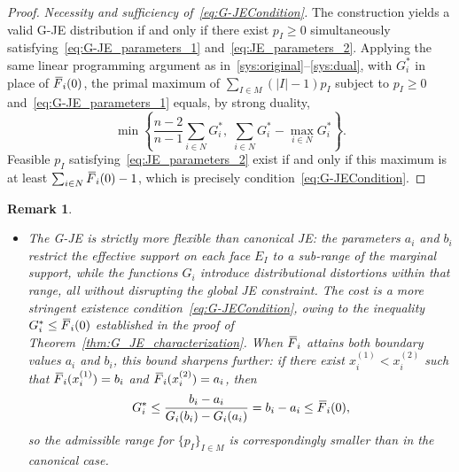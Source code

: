 \documentclass[letterpaper,12pt]{article}
\numberwithin{equation}{section}
\newtheorem{remark}[theorem]{Remark}
\newcommand{\N}{{N}}
\newcommand{\M}{{M}}
\newcommand{\I}{{I}}
\newcommand{\F}{\,\overline{\kern-0.175em F\kern-0em}}
\begin{document}
{\begin{proof}
\textit{Necessity and sufficiency of~\eqref{eq:G-JECondition}.}
The construction yields a valid G-JE distribution if and only if there exist
$p_\I\ge0$ simultaneously satisfying~\eqref{eq:G-JE_parameters_1}
and~\eqref{eq:JE_parameters_2}. Applying the same linear programming argument as
in~\eqref{sys:original}--\eqref{sys:dual}, with $G_i^*$ in place of $\F_i(0)$,
the primal maximum of $\sum_{\I\in\M}(|\I|-1)p_\I$ subject to
$p_\I\ge0$ and~\eqref{eq:G-JE_parameters_1} equals, by strong duality,
\[
\min\left\{\frac{n-2}{n-1}\sum_{i\in\N}G_i^*,\;
\sum_{i\in\N}G_i^*-\max_{i\in\N}G_i^*\right\}.
\]
Feasible $p_\I$ satisfying~\eqref{eq:JE_parameters_2} exist if and only if this
maximum is at least $\sum_{i\in\N}\F_i(0)-1$, which is precisely
condition~\eqref{eq:G-JECondition}.
\end{proof}


\begin{remark}
\label{rm:G-JE_Remark}
\mbox{}
\begin{itemize}

\item[(1)]
The G-JE is strictly more flexible than canonical JE: the parameters $a_i$ and
$b_i$ restrict the effective support on each face $E_\I$ to a sub-range of the
marginal support, while the functions $G_i$ introduce distributional distortions
within that range, all without disrupting the global JE constraint. The cost is a
more stringent existence condition~\eqref{eq:G-JECondition}, owing to the
inequality $G_i^*\le\F_i(0)$ established in the proof of
Theorem~\ref{thm:G_JE_characterization}. When $\F_i$ attains both boundary
values $a_i$ and $b_i$, this bound sharpens further: if there exist
$x_i^{(1)}<x_i^{(2)}$ such that $\F_i(x_i^{(1)})=b_i$ and
$\F_i(x_i^{(2)})=a_i$, then
\[
G_i^*\le\frac{b_i-a_i}{G_i(b_i)-G_i(a_i)}=b_i-a_i\le\F_i(0),
\]
so the admissible range for $\{p_\I\}_{\I\in\M}$ is correspondingly smaller
than in the canonical case.


\end{itemize}
\end{remark}}
\end{document}
